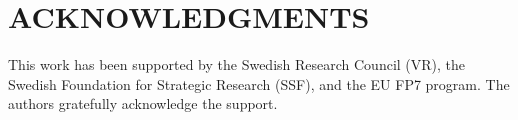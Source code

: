 \documentclass[letterpaper, 10pt, conference]{ieeeconf}
\begin{document}

\section*{ACKNOWLEDGMENTS}

{This work has been supported by the Swedish Research Council (VR), the Swedish Foundation for Strategic Research (SSF), and the EU FP7 program. The authors gratefully acknowledge the support.}



\end{document}
